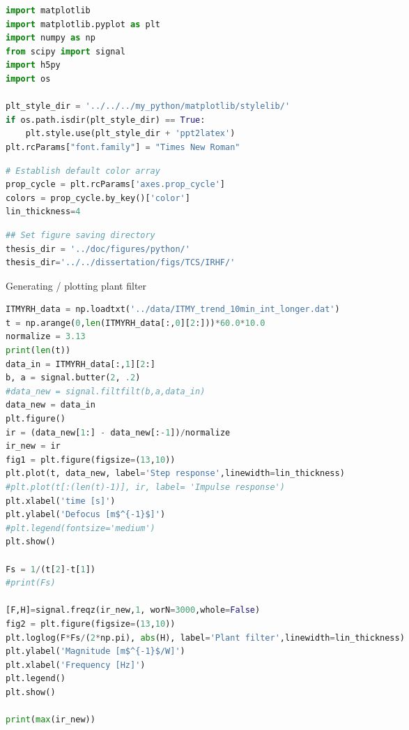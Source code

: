 \begin{spacing}{1.2} \begin{lstlisting}[frame=single,language=Python]
import matplotlib
import matplotlib.pyplot as plt
import numpy as np
from scipy import signal
import h5py
import os

plt_style_dir = '../../../my_python/matplotlib/stylelib/'
if os.path.isdir(plt_style_dir) == True:
    plt.style.use(plt_style_dir + 'ppt2latex')
plt.rcParams["font.family"] = "Times New Roman"
\end{lstlisting} \end{spacing}

\begin{spacing}{1.2} \begin{lstlisting}[frame=single,language=Python]
# Establish default color array
prop_cycle = plt.rcParams['axes.prop_cycle']
colors = prop_cycle.by_key()['color']
lin_thickness=4
\end{lstlisting} \end{spacing}

\begin{spacing}{1.2} \begin{lstlisting}[frame=single,language=Python]
## Set figure saving directory
thesis_dir = '../doc/figures/python/'
thesis_dir='../../dissertation/figs/TCS/IRHF/'
\end{lstlisting} \end{spacing}

Generating / plotting plant filter

\begin{spacing}{1.2} \begin{lstlisting}[frame=single,language=Python]
ITMYRH_data = np.loadtxt('../data/ITMY_trend_10min_int_longer.dat')
t = np.arange(0,len(ITMYRH_data[:,0][2:]))*60.0*10.0
normalize = 3.13
print(len(t))
data_in = ITMYRH_data[:,1][2:]
b, a = signal.butter(2, .2)
#data_new = signal.filtfilt(b,a,data_in)
data_new = data_in
plt.figure()
ir = (data_new[1:] - data_new[:-1])/normalize
ir_new = ir
fig1 = plt.figure(figsize=(13,10))
plt.plot(t, data_new, label='Step response',linewidth=lin_thickness)
#plt.plot(t[:(len(t)-1)], ir, label= 'Impulse response')
plt.xlabel('time [s]')
plt.ylabel('Defocus [m$^{-1}$]')
#plt.legend(fontsize='medium')
plt.show()

Fs = 1/(t[2]-t[1])
#print(Fs)

[F,H]=signal.freqz(ir_new,1, worN=3000,whole=False) 
fig2 = plt.figure(figsize=(13,10))
plt.loglog(F*Fs/(2*np.pi), abs(H), label='Plant filter',linewidth=lin_thickness)
plt.ylabel('Magnitude [m$^{-1}$/W]')
plt.xlabel('Frequency [Hz]')
plt.legend()
plt.show()

print(max(ir_new))
\end{lstlisting} \end{spacing}

